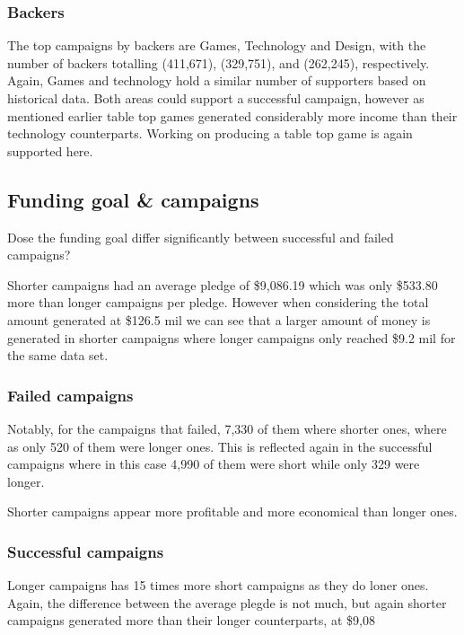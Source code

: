 \documentclass{article}
\begin{document}
\subsubsection{Backers}

\noindent The top campaigns by backers are Games, Technology and Design, with the number of backers totalling (411,671), (329,751), and (262,245), respectively. Again, Games and technology hold a similar number of supporters based on historical data. Both areas could support a successful campaign, however as mentioned earlier table top games generated considerably more income than their technology counterparts. Working on producing a table top game is again supported here. 

\medskip
\subsection{Funding goal \& campaigns}
\noindent Dose the funding goal differ significantly between successful and failed campaigns?

\noindent Shorter campaigns had an average pledge of \$9,086.19 which was only \$533.80 more than longer campaigns per pledge. However when considering the total amount generated at \$126.5 mil we can see that a larger amount of money is generated in shorter campaigns where longer campaigns only reached \$9.2 mil for the same data set. 

\subsubsection{Failed campaigns}
\noindent Notably, for the campaigns that failed, 7,330 of them where shorter ones, where as only 520 of them were longer ones. This is reflected again in the successful campaigns where in this case 4,990 of them were short while only 329 were longer. 

\medskip

\noindent Shorter campaigns appear more profitable and more economical than longer ones. 

\subsubsection{Successful campaigns} 
\noindent Longer campaigns has 15 times more short campaigns as they do loner ones. Again, the difference between the average plegde is not much, but again shorter campaigns generated more than their longer counterparts, at \$9,08
\end{document}

